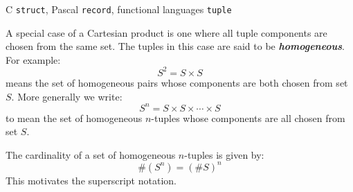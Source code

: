\documentclass{article}
\begin{document}
C \texttt{struct}, Pascal \texttt{record}, functional languages \texttt{tuple}

A special case of a Cartesian product is one where all tuple components are chosen from the same set. The tuples in this case are said to be \textbf{\textit{homogeneous}}. For example:
\begin{equation}
    S^2 = S \times S
\end{equation}
means the set of homogeneous pairs whose components are both chosen from set $S$. More generally we write:
\begin{equation}
    S^n = S \times S \times \cdots \times S
\end{equation}
to mean the set of homogeneous $n$-tuples whose components are all chosen from set $S$.

The cardinality of a set of homogeneous $n$-tuples is given by:
\begin{equation}
    \text{\#}(S^n) = (\text{\#}S)^n
\end{equation}
This motivates the superscript notation.
\end{document}
